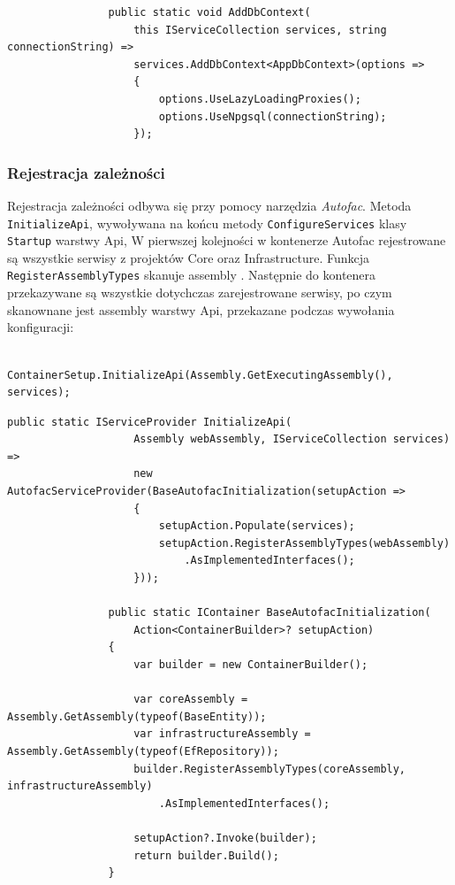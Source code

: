 			\begin{lstlisting}
				public static void AddDbContext(
					this IServiceCollection services, string connectionString) =>
					services.AddDbContext<AppDbContext>(options =>
					{
						options.UseLazyLoadingProxies();
						options.UseNpgsql(connectionString);
					});
			\end{lstlisting}

		\subsubsection*{Rejestracja zależności}
			Rejestracja zależności odbywa się przy pomocy narzędzia \emph{Autofac}.
			Metoda \verb|InitializeApi|, wywoływana na końcu metody \verb|ConfigureServices| klasy \verb|Startup| warstwy Api,
			W pierwszej kolejności w kontenerze Autofac rejestrowane są wszystkie serwisy z projektów Core oraz Infrastructure.
			Funkcja \verb|RegisterAssemblyTypes| skanuje assembly .
			Następnie do kontenera przekazywane są wszystkie dotychczas zarejestrowane serwisy,
			po czym skanownane jest assembly warstwy Api, przekazane podczas wywołania konfiguracji:
			\begin{lstlisting}
				ContainerSetup.InitializeApi(Assembly.GetExecutingAssembly(), services);
			\end{lstlisting}

			\begin{lstlisting}[label=lst:autofac, caption=Rejestracja zależności wykorzystująca Autofac, float]
				public static IServiceProvider InitializeApi(
					Assembly webAssembly, IServiceCollection services) =>
					new AutofacServiceProvider(BaseAutofacInitialization(setupAction =>
					{
						setupAction.Populate(services);
						setupAction.RegisterAssemblyTypes(webAssembly)
							.AsImplementedInterfaces();
					}));
	
				public static IContainer BaseAutofacInitialization(
					Action<ContainerBuilder>? setupAction)
				{
					var builder = new ContainerBuilder();
		
					var coreAssembly = Assembly.GetAssembly(typeof(BaseEntity));
					var infrastructureAssembly = Assembly.GetAssembly(typeof(EfRepository));
					builder.RegisterAssemblyTypes(coreAssembly, infrastructureAssembly)
						.AsImplementedInterfaces();
		
					setupAction?.Invoke(builder);
					return builder.Build();
				}
			\end{lstlisting}
	
